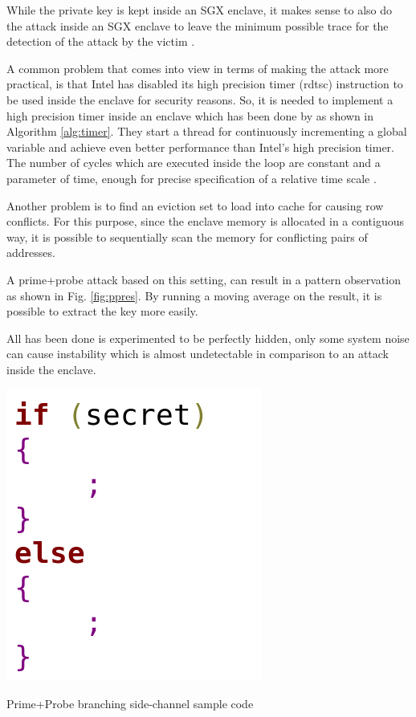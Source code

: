 While the private key is kept inside an SGX enclave, it makes sense to also do the attack inside an SGX enclave to leave the minimum possible trace for the detection of the attack by the victim \cite{mge}.

A common problem that comes into view in terms of making the attack more practical, is that Intel has disabled its high precision timer (rdtsc) instruction to be used inside the enclave for security reasons. So, it is needed to implement a high precision timer inside an enclave which has been done by \cite{mge} as shown in Algorithm \ref{alg:timer}. They start a thread for continuously incrementing a global variable and achieve even better performance than Intel's high precision timer. The number of cycles which are executed inside the loop are constant and a parameter of time, enough for precise specification of a relative time scale \cite{mge}.

Another problem is to find an eviction set to load into cache for causing row conflicts. For this purpose, since the enclave memory is allocated in a contiguous way, it is possible to sequentially scan the memory for conflicting pairs of addresses. 

A prime+probe attack based on this setting, can result in a pattern observation as shown in Fig. \ref{fig:ppres}. By running a moving average on the result, it is possible to extract the key more easily.

All has been done is experimented to be perfectly hidden, only some system noise can cause instability which is almost undetectable in comparison to an attack inside the enclave.


\begin{algorithm}[t]
	\includegraphics[scale=0.22]{images/alg}
	\caption{Prime+Probe branching side-channel sample code \cite{stealthy,cloak}}
	\label{alg:one}
\end{algorithm}

